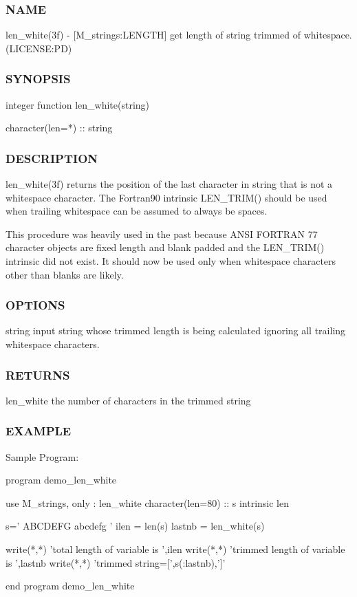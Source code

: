\subsubsection*{N\+A\+ME}

len\+\_\+white(3f) -\/ \mbox{[}M\+\_\+strings\+:L\+E\+N\+G\+TH\mbox{]} get length of string trimmed of whitespace. (L\+I\+C\+E\+N\+SE\+:PD) 

\subsubsection*{S\+Y\+N\+O\+P\+S\+IS}

\begin{DoxyVerb}integer function len_white(string)

 character(len=*) :: string
\end{DoxyVerb}
 \subsubsection*{D\+E\+S\+C\+R\+I\+P\+T\+I\+ON}

len\+\_\+white(3f) returns the position of the last character in string that is not a whitespace character. The Fortran90 intrinsic L\+E\+N\+\_\+\+T\+R\+I\+M() should be used when trailing whitespace can be assumed to always be spaces.

This procedure was heavily used in the past because A\+N\+SI F\+O\+R\+T\+R\+AN 77 character objects are fixed length and blank padded and the L\+E\+N\+\_\+\+T\+R\+I\+M() intrinsic did not exist. It should now be used only when whitespace characters other than blanks are likely. \subsubsection*{O\+P\+T\+I\+O\+NS}

string input string whose trimmed length is being calculated ignoring all trailing whitespace characters. \subsubsection*{R\+E\+T\+U\+R\+NS}

len\+\_\+white the number of characters in the trimmed string

\subsubsection*{E\+X\+A\+M\+P\+LE}

Sample Program\+: \begin{DoxyVerb}program demo_len_white

use M_strings, only : len_white
character(len=80) ::  s
intrinsic len

  s=' ABCDEFG abcdefg '
  ilen = len(s)
  lastnb = len_white(s)

  write(*,*) 'total length of variable is ',ilen
  write(*,*) 'trimmed length of variable is ',lastnb
  write(*,*) 'trimmed string=[',s(:lastnb),']'

 end program demo_len_white
\end{DoxyVerb}


